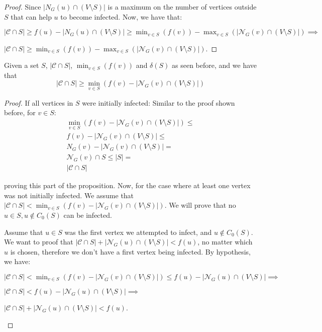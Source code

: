 \begin{proof}
Since $|{N}_G(u) \cap (V \setminus S)|$ is a maximum on the number of vertices outside $S$ that can help $u$ to become infected. Now, we have that:

$|\mathcal{C} \cap S | \geq f(u) - |{N}_G(u) \cap (V \setminus S)|  \geq \min_{v \in S} (f(v)) - \max_{v \in S} (|\mathcal{N}_G(v) \cap (V \setminus S)|)  \implies$

$|\mathcal{C} \cap S | \geq \min_{v \in S} (f(v)) - \max_{v \in S} (|\mathcal{N}_G(v) \cap (V \setminus S)|)$.

\end{proof}
\begin{mylemma}
Given a set $S$,  $|\mathcal{C} \cap S | $,  $\min_{v \in S} (f(v))$ and $\delta(S)$ as seen before, and we have that 
\begin{equation}
|\mathcal{C} \cap S | \geq  \min_{v \in S} (f(v) - |\mathcal{N}_G(v) \cap (V \setminus S)| ) 
\end{equation}
\end{mylemma}
\begin{proof}
If all vertices in $S$ were initially infected: Similar to the proof shown before,  for $v \in S$:
\begin{gather}
\min_{v \in S} (f(v) - |\mathcal{N}_G(v) \cap (V \setminus S)| ) \leq \\
f(v) - |\mathcal{N}_G(v) \cap (V \setminus S)| \leq \\ 
{N}_G(v)  - |\mathcal{N}_G(v) \cap (V \setminus S)| = \\ 
\mathcal{N}_G(v) \cap S  \leq |S| = \\
|\mathcal{C} \cap S | 
\end{gather}

proving this part of the proposition.
Now, for the case where at least one vertex was not initially infected.
We assume that  $|\mathcal{C} \cap S | <  \min_{v \in S} (f(v) - |\mathcal{N}_G(v) \cap (V \setminus S)|) $. We will prove that no $u \in S, u \notin C_0(S)$ can be infected.

Assume that $u \in S$ was the first vertex we attempted to infect, and $u \notin C_0(S)$. We want to proof that $|\mathcal{C} \cap S | + |\mathcal{N}_G(u) \cap (V \setminus S)| < f(u)$, no matter which $u$ is chosen, therefore we don't have a first vertex being infected.  
By hypothesis, we have:
\begin{center}
$|\mathcal{C} \cap S | <  \min_{v \in S} (f(v) - |\mathcal{N}_G(v) \cap (V \setminus S)|) \leq f(u) - |\mathcal{N}_G(u) \cap (V \setminus S)| \implies$

$|\mathcal{C} \cap S | <  f(u) - |\mathcal{N}_G(u) \cap (V \setminus S)| \implies$

$|\mathcal{C} \cap S | + |\mathcal{N}_G(u) \cap (V \setminus S)|<  f(u)$.
\end{center}
\end{proof}

